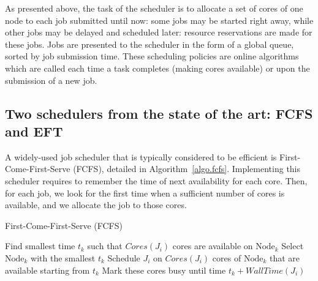 \documentclass[conference]{IEEEtran}
\newcommand{\Node}[1]{\ensuremath{\mathrm{Node}_{#1}}\xspace}
\newcommand{\core}{\mathit{Cores}\xspace}
\newcommand{\walltime}{\mathit{WallTime}\xspace}
\newcommand{\nodeset}{\ensuremath{\mathbb{N}}\xspace}
\begin{document}
As presented above, the task of the scheduler is to allocate a set of
cores of one node
to each job submitted until now: some jobs may be started right away,
while other jobs may be delayed and scheduled later: resource
reservations are made for these jobs. Jobs are presented to the
scheduler in the form of a global queue, sorted by job submission
time. These scheduling policies are online algorithms which are called each time
a task completes (making cores available) or upon the submission of
a new job.

\subsection{Two schedulers from the state of the art: FCFS and EFT}\label{subsec.fcfs_eft}

A widely-used job scheduler that is typically considered to be efficient is
First-Come-First-Serve (FCFS), detailed in
Algorithm~\ref{algo.fcfs}. Implementing this scheduler requires to
remember the time of next availability for each core. Then, for each job, we look
for the first time when a sufficient number of cores is available, and we allocate the job to
those cores.


\begin{algorithm}[htbp]%
\caption{First-Come-First-Serve (FCFS)}\label{algo.fcfs}
\begin{algorithmic}[1]
        \ForEach{$\Node{k} \in \nodeset$}
        \State Find smallest time $t_k$ such that $\core(J_i)$ cores are available on \Node{k}\label{fcfs.ln.find}
        \EndFor
        \State Select \Node{k}  with the smallest $t_k$
        \State Schedule $J_i$ on $\core(J_i)$ cores of \Node{k} that are available starting from $t_k$
        \State Mark these cores busy until time $t_k +\walltime(J_i)$
	\EndFor
	\end{algorithmic}
\end{algorithm}
\end{document}
